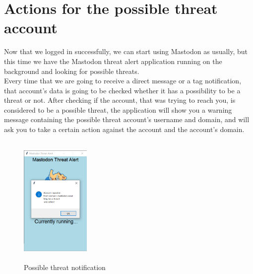 \section{Actions for the possible threat account}
\label{s:Actions_threat}
Now that we logged in successfully, we can start using Mastodon as usually, but this
time we have the Mastodon threat alert application running on the background and looking
for possible threats.
\\[5pt]
Every time that we are going to receive a direct message or a tag notification, that account's data is going to be checked whether it has a possibility to be a threat or not. After checking
if the account, that was trying to reach you, is considered to be a possible threat, the application
will show you a warning message containing the possible threat account's username and domain,
and will ask you to take a certain action against the account and the account's domain.
\begin{figure}[H]
	\centering
	\includegraphics[width=0.3\textwidth,height=240px]{images/threatnotif.png}
	\caption{Possible threat notification}
	\label{fig:possible_threat_notification}
\end{figure}

